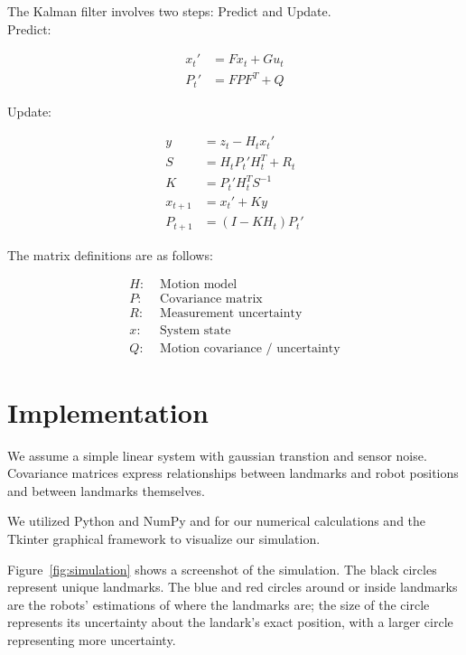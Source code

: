 \documentclass[prodmode,acmtecs]{acmsmall} %
\begin{document}
The Kalman filter involves two steps: Predict and Update. \\

Predict:

\begin{align*}
    x_t' &= F x_t + G u_t \\
    P_t' &= F P F^T + Q
\end{align*}

Update:

\begin{align*}
    y &= z_t - H_t x_t' \\
    S &= H_t P_t' H^T_t + R_t \\
    K &= P_t' H^T_t S^{-1} \\
    x_{t+1} &= x_t' + Ky \\
    P_{t+1} &= (I - K H_t) P_t'
\end{align*}

The matrix definitions are as follows:

\begin{align*}
    H:& \text{ Motion model}\\
    P:& \text{ Covariance matrix}\\
    R:& \text{ Measurement uncertainty}\\
    x:& \text{ System state}\\
    Q:& \text{ Motion covariance / uncertainty}
\end{align*}

\section{Implementation}

We assume a simple linear system with gaussian transtion and sensor noise.  Covariance matrices express relationships between landmarks and robot positions and between landmarks themselves.  

We utilized Python and NumPy and for our numerical calculations and the Tkinter graphical framework to visualize our simulation.

Figure~\ref{fig:simulation} shows a screenshot of the simulation.  The black circles represent unique landmarks.  The blue and red circles around or inside landmarks are the robots' estimations of where the landmarks are; the size of the circle represents its uncertainty about the landark's exact position, with a larger circle representing more uncertainty.
\end{document}
